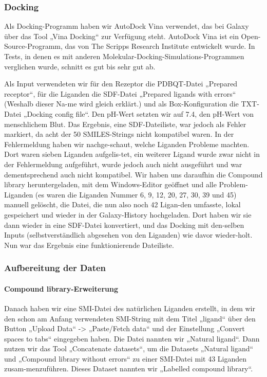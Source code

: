 \documentclass[10pt]{article}
\begin{document}
{    %

    \subsubsection{Docking}

    Als Docking-Programm haben wir AutoDock Vina verwendet, das bei Galaxy über das Tool „Vina Docking“ zur Verfügung steht. AutoDock Vina ist ein Open-Source-Programm, das von The Scripps Research Institute entwickelt wurde. In Tests, in denen es mit anderen Molekular-Docking-Simulations-Programmen verglichen wurde, schnitt es gut bis sehr gut ab.


    Als Input verwendeten wir für den Rezeptor die PDBQT-Datei „Prepared receptor“, für die Liganden die SDF-Datei „Prepared ligands with errors“ (Weshalb dieser Na-me wird gleich erklärt.) und als Box-Konfiguration die TXT-Datei „Docking config file“. Den pH-Wert setzten wir auf 7.4, den pH-Wert von menschlichem Blut.
    Das Ergebnis, eine SDF-Dateiliste, war jedoch als Fehler markiert, da acht der 50 SMILES-Strings nicht kompatibel waren. In der Fehlermeldung haben wir nachge-schaut, welche Liganden Probleme machten. Dort waren sieben Liganden aufgelis-tet, ein weiterer Ligand wurde zwar nicht in der Fehlermeldung aufgeführt, wurde jedoch auch nicht ausgeführt und war dementsprechend auch nicht kompatibel. Wir haben uns daraufhin die Compound library heruntergeladen, mit dem Windows-Editor geöffnet und alle Problem-Liganden (es waren die Liganden Nummer 6, 9, 12, 20, 27, 30, 39 und 45) manuell gelöscht, die Datei, die nun also noch 42 Ligan-den umfasste, lokal gespeichert und wieder in der Galaxy-History hochgeladen. Dort haben wir sie dann wieder in eine SDF-Datei konvertiert, und das Docking mit den-selben Inputs (selbstverständlich abgesehen von den Liganden) wie davor wieder-holt.
    Nun war das Ergebnis eine funktionierende Dateiliste.


    \subsubsection{Aufbereitung der Daten}

    \paragraph{Compound library-Erweiterung}
    Danach haben wir eine SMI-Datei des natürlichen Liganden erstellt, in dem wir den schon am Anfang verwendeten SMI-String mit dem Titel „ligand“ über den Button „Upload Data“ -> „Paste/Fetch data“ und der Einstellung „Convert spaces to tabs“ eingegeben haben. Die Datei nannten wir „Natural ligand“.
    Dann nutzen wir das Tool „Concatenate datasets“, um die Datasets „Natural ligand“ und „Compound library without errors“ zu einer SMI-Datei mit 43 Liganden zusam-menzuführen. Dieses Dataset nannten wir „Labelled compound library“.

}
\end{document}
